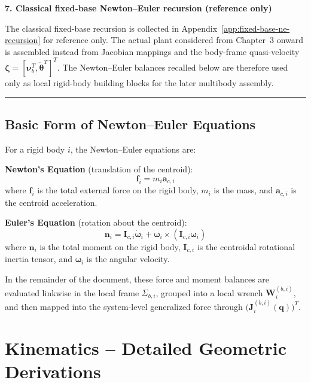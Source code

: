 \documentclass[12pt,a4paper]{report}
\newcommand{\Frame}[1]{\Sigma_{#1}}
\begin{document}
\textbf{7. Classical fixed-base Newton--Euler recursion (reference only)}

The classical fixed-base recursion is collected in Appendix~\ref{app:fixed-base-ne-recursion} for reference only. The actual plant considered from Chapter~3 onward is assembled instead from Jacobian mappings and the body-frame quasi-velocity $\boldsymbol{\zeta} = [\boldsymbol{\nu}_b^T,\dot{\boldsymbol{\theta}}^T]^T$. The Newton--Euler balances recalled below are therefore used only as local rigid-body building blocks for the later multibody assembly.

\vspace{2em}
\hrule
\vspace{1em}


\section{Basic Form of Newton--Euler Equations}

For a rigid body $i$, the Newton--Euler equations are:

\textbf{Newton's Equation} (translation of the centroid):
\begin{equation}
\mathbf{f}_i = m_i \mathbf{a}_{c,i}
\end{equation}
where $\mathbf{f}_i$ is the total external force on the rigid body, $m_i$ is the mass, and $\mathbf{a}_{c,i}$ is the centroid acceleration.

\textbf{Euler's Equation} (rotation about the centroid):
\begin{equation}
\mathbf{n}_i
=
\mathbf{I}_{c,i}\dot{\boldsymbol{\omega}}_i
+
\boldsymbol{\omega}_i \times (\mathbf{I}_{c,i}\boldsymbol{\omega}_i)
\end{equation}
where $\mathbf{n}_i$ is the total moment on the rigid body, $\mathbf{I}_{c,i}$ is the centroidal rotational inertia tensor, and $\boldsymbol{\omega}_i$ is the angular velocity.

In the remainder of the document, these force and moment balances are evaluated linkwise in the local frame $\Frame{b,i}$, grouped into a local wrench $\mathbf{W}_i^{(b,i)}$, and then mapped into the system-level generalized force through $\bigl(\mathbf{J}_i^{(b,i)}(\mathbf{q})\bigr)^T$.

\chapter{Kinematics -- Detailed Geometric Derivations}
\end{document}
